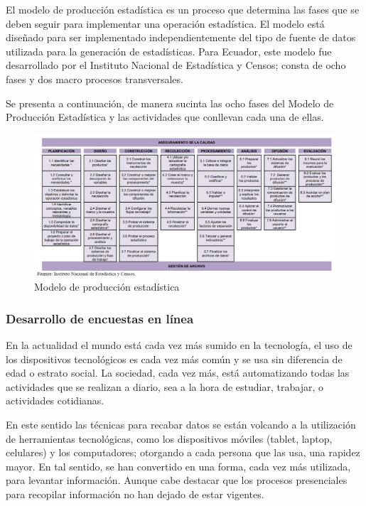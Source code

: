 \documentclass[a5paper,doc,10pt,noapacite]{apa6}
\begin{document}
{{El modelo de producción estadística es un proceso que determina las fases que se deben seguir para implementar una operación estadística. El modelo está diseñado para ser implementado independientemente del tipo de fuente de datos utilizada para la generación de estadísticas. Para Ecuador, este modelo fue desarrollado por el Instituto Nacional de Estadística y Censos; consta de ocho fases y dos macro procesos transversales.

Se presenta a continuación, de manera sucinta las ocho fases del Modelo de Producción Estadística y las actividades que conllevan cada una de ellas.

\begin{figure}[H]
	\fontsize{7}{11}\selectfont
	\captionsetup{justification=centering, labelfont=footnotesize, font=footnotesize}
\caption*{Modelo de producción estadística}
\centering
\includegraphics[scale=0.35]{Graficos/fig14_GC.jpg}
\end{figure}

\subsubsection{Desarrollo de encuestas en línea}
En la actualidad el mundo está cada vez más sumido en la tecnología, el uso de los dispositivos tecnológicos es cada vez más común y se usa sin diferencia de edad o estrato social. La sociedad, cada vez más, está automatizando todas las actividades que se realizan a diario, sea a la hora de estudiar, trabajar, o actividades cotidianas.

En este sentido las técnicas para recabar datos se están volcando a la utilización de herramientas tecnológicas, como los dispositivos móviles (tablet, laptop, celulares) y los computadores; otorgando a cada persona que las usa, una rapidez mayor. En tal sentido, se han convertido en una forma, cada vez más utilizada, para levantar información. Aunque cabe destacar que los procesos presenciales para recopilar información no han dejado de estar vigentes.

}}
\end{document}
